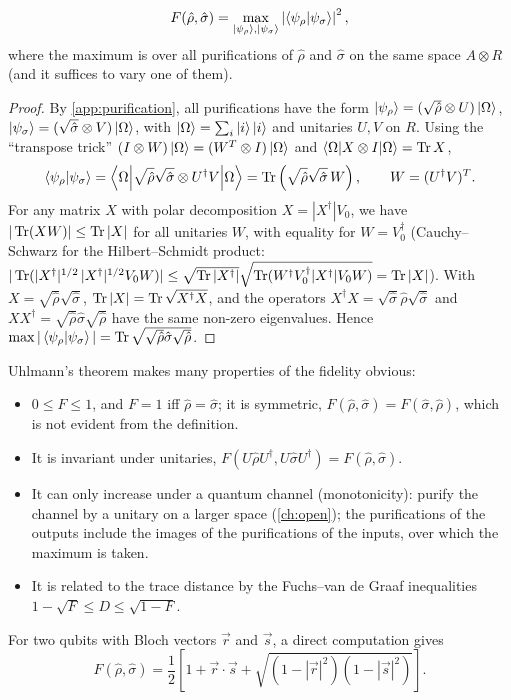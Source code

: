 \begin{theorem}[Uhlmann, 1976]
\begin{equation}
  F(\hat\rho,\hat\sigma)=\max_{\left|\psi_\rho\right\rangle,\left|\psi_\sigma\right\rangle}\left|\left\langle\psi_\rho\middle|\psi_\sigma\right\rangle\right|^2,
\end{equation}
where the maximum is over all purifications of $\hat\rho$ and $\hat\sigma$ on the same space $A\otimes R$ (and it suffices to vary one of them).
\end{theorem}
\begin{proof}
By \cref{app:purification}, all purifications have the form $\left|\psi_\rho\right\rangle=(\sqrt{\hat\rho}\otimes U)\left|\Omega\right\rangle$, $\left|\psi_\sigma\right\rangle=(\sqrt{\hat\sigma}\otimes V)\left|\Omega\right\rangle$, with $\left|\Omega\right\rangle=\sum_i\left|i\right\rangle\left|i\right\rangle$ and unitaries $U,V$ on $R$. Using the ``transpose trick''
$(I\otimes W)\left|\Omega\right\rangle=(W^T\otimes I)\left|\Omega\right\rangle$ and $\left\langle\Omega\middle|X\otimes I\middle|\Omega\right\rangle=\operatorname{Tr} X$,
\begin{equation}
  \left\langle\psi_\rho\middle|\psi_\sigma\right\rangle=\left\langle\Omega\middle|\sqrt{\hat\rho}\sqrt{\hat\sigma}\otimes U^\dagger V\middle|\Omega\right\rangle=\operatorname{Tr}\left(\sqrt{\hat\rho}\sqrt{\hat\sigma}\,W\right),\qquad W=(U^\dagger V)^T .
\end{equation}
For any matrix $X$ with polar decomposition $X=|X^\dagger|V_0$, we have $|\operatorname{Tr}(XW)|\le\operatorname{Tr}|X|$ for all unitaries $W$, with equality for $W=V_0^\dagger$ (Cauchy--Schwarz for the Hilbert--Schmidt product:
$|\operatorname{Tr}(|X^\dagger|^{1/2}\,|X^\dagger|^{1/2}V_0W)|\le\sqrt{\operatorname{Tr}|X^\dagger|}\sqrt{\operatorname{Tr}(W^\dagger V_0^\dagger|X^\dagger|V_0W)}=\operatorname{Tr}|X|$). With $X=\sqrt{\hat\rho}\sqrt{\hat\sigma}$, $\operatorname{Tr}|X|=\operatorname{Tr}\sqrt{X^\dagger X}$, and the operators $X^\dagger X=\sqrt{\hat\sigma}\hat\rho\sqrt{\hat\sigma}$ and
$XX^\dagger=\sqrt{\hat\rho}\hat\sigma\sqrt{\hat\rho}$ have the same non-zero eigenvalues. Hence $\max|\left\langle\psi_\rho\middle|\psi_\sigma\right\rangle|=\operatorname{Tr}\sqrt{\sqrt{\hat\rho}\hat\sigma\sqrt{\hat\rho}}$.
\end{proof}
Uhlmann's theorem makes many properties of the fidelity obvious:
\begin{itemize}
  \item $0\le F\le1$, and $F=1$ iff $\hat\rho=\hat\sigma$; it is symmetric, $F(\hat\rho,\hat\sigma)=F(\hat\sigma,\hat\rho)$, which is not evident from the definition.
  \item It is invariant under unitaries, $F(U\hat\rho U^\dagger,U\hat\sigma U^\dagger)=F(\hat\rho,\hat\sigma)$.
  \item It can only increase under a quantum channel (monotonicity): purify the channel by a unitary on a larger space (\cref{ch:open}); the purifications of the outputs include the images of the purifications of the inputs, over which the maximum is taken.
  \item It is related to the trace distance by the Fuchs--van de Graaf inequalities $1-\sqrt F\le D\le\sqrt{1-F}$.
\end{itemize}
For two qubits with Bloch vectors $\vec r$ and $\vec s$, a direct computation gives
\begin{equation}
  F(\hat\rho,\hat\sigma)=\frac12\left[1+\vec r\cdot\vec s+\sqrt{(1-|\vec r|^2)(1-|\vec s|^2)}\right].
\end{equation}

